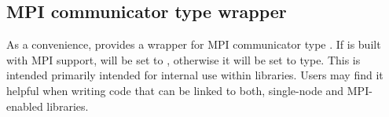 %

\subsection{MPI communicator type wrapper}

As a convenience, {\sundials} provides a wrapper for MPI communicator type
. If {\sundials} is built with MPI support, 
will be set to , otherwise it will be set to  type.
This is intended primarily intended for internal use within {\sundials}
libraries. Users may find it helpful when writing code that can be linked
to both, single-node and MPI-enabled {\sundials} libraries.
